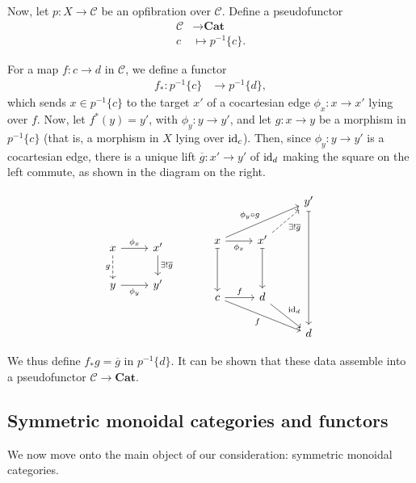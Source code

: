 \documentclass{MetricNotes2023}
\def\id{\ensuremath\text{id}}
\begin{document}
Now, let \(p : X \to \mathcal{C}\) be an opfibration over \(\mathcal{C}\). Define a pseudofunctor 
\begin{align*}
\mathcal{C}&\to \textbf{Cat}\\
c &\mapsto p^{-1}\{c\}.
\end{align*}

For a map \(f : c \to d\) in \(\mathcal{C}\), we define a functor 
\begin{align*}
f_* : p^{-1}\{c\}&\to p^{-1}\{d\},
\end{align*}
which sends \(x \in p^{-1}\{c\}\) to the target \(x'\) of a cocartesian edge \(\phi_x : x \to x'\) lying over \(f\). Now, let \(f^*(y)=y'\), with \(\phi_y : y \to y'\), and let \(g : x \to y\) be a morphism in \(p^{-1}\{c\}\) (that is, a morphism in \(X\) lying over \(\id_c\)). Then, since \(\phi_y : y \to y'\) is a cocartesian edge, there is a unique lift \(\overline g : x' \to y'\) of \(\id_d\) making the square on the left commute, as shown in the diagram on the right. 

\[\begin{tikzcd}
x \arrow[r, "\phi_x"] \arrow[d, swap, dashrightarrow, " g"]  & x' \arrow[d, "\exists!\overline g"]  \\
y \arrow[r, swap, "\phi_y"]  & y'
\end{tikzcd}\quad\quad\quad \begin{tikzcd}
 & & y' \arrow[dddd, mapsto, ""] \\
x \arrow[urr, "\phi_y \circ g"] \arrow[r, swap, "\phi_x"] \arrow[dd, mapsto, swap, ""] & x' \arrow[ur, dashrightarrow, swap,  "\exists! \overline g"] \arrow[dd, mapsto, swap, ""]  & \\
& & \\
c \arrow[r, "f"] \arrow[rrd, swap, "f"] & d \arrow[rd, "\id_d"]  & \\
 & & d
\end{tikzcd}\]

We thus define \(f_*g=\overline{g}\) in \(p^{-1}\{d\}\). It can be shown that these data assemble into a pseudofunctor \(\mathcal{C}\to \textbf{Cat}\).

\subsection{Symmetric monoidal categories and functors}

We now move onto the main object of our consideration: symmetric monoidal categories. 
\end{document}

